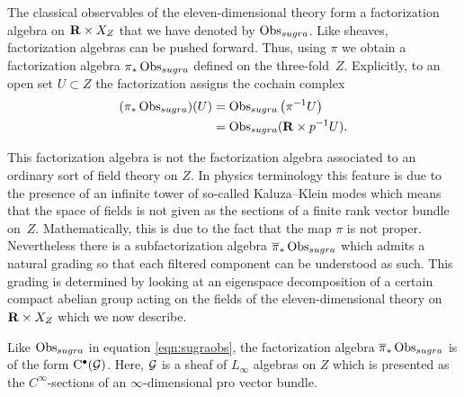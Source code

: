 The classical observables of the eleven-dimensional theory form a factorization algebra on $\mathbf{R} \times X_Z$ that we have denoted by $\operatorname{Obs}_{sugra}$.
Like sheaves, factorization algebras can be pushed forward.
Thus, using $\pi$ we obtain a factorization algebra $\pi_* \operatorname{Obs}_{sugra}$ defined on the three-fold~$Z$.
Explicitly, to an open set $U \subset Z$ the factorization assigns the cochain complex
\begin{align*}
(\pi_* \operatorname{Obs}_{sugra}) (U) & = \operatorname{Obs}_{sugra} \left(\pi^{-1} U\right) \\
& = \operatorname{Obs}_{sugra}(\mathbf{R} \times p^{-1}U) .
\end{align*}

This factorization algebra is not the factorization algebra associated to an ordinary sort of field theory on $Z$.
In physics terminology this feature is due to the presence of an infinite tower of so-called Kaluza--Klein modes which means that the space of fields is not given as the sections of a finite rank vector bundle on~$Z$.
Mathematically, this is due to the fact that the map $\pi$ is not proper.
Nevertheless there is a subfactorization algebra $\overline{\pi}_* \operatorname{Obs}_{sugra}$ which admits a natural grading so that each filtered component can be understood as such. 
This grading is determined by looking at an eigenspace decomposition of a certain compact abelian group acting on the fields of the eleven-dimensional theory on $\mathbf{R} \times X_Z$ which we now describe. 

Like $\operatorname{Obs}_{sugra}$ in equation \eqref{eqn:sugraobs}, the factorization algebra $\overline{\pi}_* \operatorname{Obs}_{sugra}$ is of the form ${\rm C}^\bullet(\mathcal G)$.
Here, $\mathcal G$ is a sheaf of $L_\infty$ algebras on $Z$ which is presented as the $C^\infty$-sections of an $\infty$-dimensional pro vector bundle.

